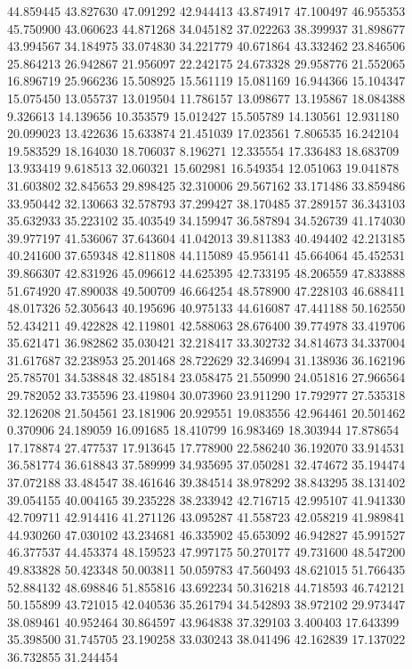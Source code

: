 44.859445
43.827630
47.091292
42.944413
43.874917
47.100497
46.955353
45.750900
43.060623
44.871268
34.045182
37.022263
38.399937
31.898677
43.994567
34.184975
33.074830
34.221779
40.671864
43.332462
23.846506
25.864213
26.942867
21.956097
22.242175
24.673328
29.958776
21.552065
16.896719
25.966236
15.508925
15.561119
15.081169
16.944366
15.104347
15.075450
13.055737
13.019504
11.786157
13.098677
13.195867
18.084388
9.326613
14.139656
10.353579
15.012427
15.505789
14.130561
12.931180
20.099023
13.422636
15.633874
21.451039
17.023561
7.806535
16.242104
19.583529
18.164030
18.706037
8.196271
12.335554
17.336483
18.683709
13.933419
9.618513
32.060321
15.602981
16.549354
12.051063
19.041878
31.603802
32.845653
29.898425
32.310006
29.567162
33.171486
33.859486
33.950442
32.130663
32.578793
37.299427
38.170485
37.289157
36.343103
35.632933
35.223102
35.403549
34.159947
36.587894
34.526739
41.174030
39.977197
41.536067
37.643604
41.042013
39.811383
40.494402
42.213185
40.241600
37.659348
42.811808
44.115089
45.956141
45.664064
45.452531
39.866307
42.831926
45.096612
44.625395
42.733195
48.206559
47.833888
51.674920
47.890038
49.500709
46.664254
48.578900
47.228103
46.688411
48.017326
52.305643
40.195696
40.975133
44.616087
47.441188
50.162550
52.434211
49.422828
42.119801
42.588063
28.676400
39.774978
33.419706
35.621471
36.982862
35.030421
32.218417
33.302732
34.814673
34.337004
31.617687
32.238953
25.201468
28.722629
32.346994
31.138936
36.162196
25.785701
34.538848
32.485184
23.058475
21.550990
24.051816
27.966564
29.782052
33.735596
23.419804
30.073960
23.911290
17.792977
27.535318
32.126208
21.504561
23.181906
20.929551
19.083556
42.964461
20.501462
0.370906
24.189059
16.091685
18.410799
16.983469
18.303944
17.878654
17.178874
27.477537
17.913645
17.778900
22.586240
36.192070
33.914531
36.581774
36.618843
37.589999
34.935695
37.050281
32.474672
35.194474
37.072188
33.484547
38.461646
39.384514
38.978292
38.843295
38.131402
39.054155
40.004165
39.235228
38.233942
42.716715
42.995107
41.941330
42.709711
42.914416
41.271126
43.095287
41.558723
42.058219
41.989841
44.930260
47.030102
43.234681
46.335902
45.653092
46.942827
45.991527
46.377537
44.453374
48.159523
47.997175
50.270177
49.731600
48.547200
49.833828
50.423348
50.003811
50.059783
47.560493
48.621015
51.766435
52.884132
48.698846
51.855816
43.692234
50.316218
44.718593
46.742121
50.155899
43.721015
42.040536
35.261794
34.542893
38.972102
29.973447
38.089461
40.952464
30.864597
43.964838
37.329103
3.400403
17.643399
35.398500
31.745705
23.190258
33.030243
38.041496
42.162839
17.137022
36.732855
31.244454
